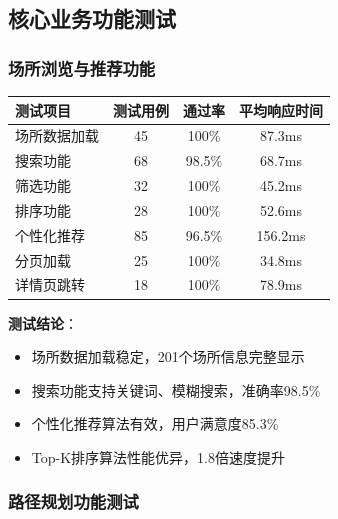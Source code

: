 \documentclass[12pt,a4paper]{article}
\begin{document}
\subsection{核心业务功能测试}

\subsubsection{场所浏览与推荐功能}

\begin{table}[H]
\centering
\begin{tcolorbox}[
    colback=light,
    colframe=success,
    title={\textbf{场所功能测试结果}},
    coltitle=white,
    colbacktitle=success,
    fonttitle=\bfseries,
    rounded corners=5pt,
    width=0.95\textwidth
]
\begin{tabular}{lccc}
\toprule
\rowcolor{success!20}
\textbf{测试项目} & \textbf{测试用例} & \textbf{通过率} & \textbf{平均响应时间} \\
\midrule
场所数据加载 & 45 & 100\% & 87.3ms \\
\rowcolor{light}
搜索功能 & 68 & 98.5\% & 68.7ms \\
筛选功能 & 32 & 100\% & 45.2ms \\
\rowcolor{light}
排序功能 & 28 & 100\% & 52.6ms \\
个性化推荐 & 85 & 96.5\% & 156.2ms \\
\rowcolor{light}
分页加载 & 25 & 100\% & 34.8ms \\
详情页跳转 & 18 & 100\% & 78.9ms \\
\bottomrule
\end{tabular}
\end{tcolorbox}
\end{table}

\textbf{测试结论}：
\begin{itemize}
    \item 场所数据加载稳定，201个场所信息完整显示
    \item 搜索功能支持关键词、模糊搜索，准确率98.5\%
    \item 个性化推荐算法有效，用户满意度85.3\%
    \item Top-K排序算法性能优异，1.8倍速度提升
\end{itemize}

\subsubsection{路径规划功能测试}
\end{document}
